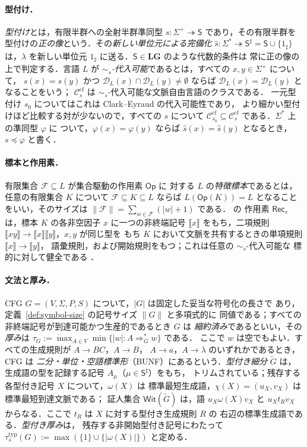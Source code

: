 \documentclass[11pt,a4paper]{ltjsarticle}
\numberwithin{equation}{section}
\theoremstyle{plain}
\theoremstyle{definition}
\theoremstyle{remark}
\theoremstyle{plain}
\newcommand{\cf}{\mathrm{cf}}
\newcommand{\Ccf}[1]{\mathcal C_{#1}^{\cf}}
\newcommand{\Rec}{\mathsf{Rec}}
\newcommand{\WitnessSet}{\mathsf{Wit}}
\newcommand{\NT}[1]{\llbracket #1\rrbracket}
\newcommand{\D}{\mathcal{D}}
\newcommand{\LG}{\mathbf{LG}}
\begin{document}
\paragraph{型付け．}
\emph{型付け}とは，有限半群への全射半群準同型
$s:\Sigma^+\twoheadrightarrow\mathsf S$ であり，その有限半群を
型付けの\emph{正の像}という．その\emph{新しい単位元による完備化}
$\widehat s:\Sigma^*\twoheadrightarrow\mathsf S^\sharp=\mathsf S\cup\{1_\sharp\}$
は，$\lambda$ を新しい単位元 $1_\sharp$ に送る．$\mathsf S\in\LG$ のような代数的条件は
常に正の像の上で判定する．言語 $L$ が
\emph{$\sim_s$-代入可能}であるとは，すべての $x,y\in\Sigma^+$ について，
$s(x)=s(y)$ かつ $\D_L(x)\cap\D_L(y)\ne\emptyset$ ならば
$\D_L(x)=\D_L(y)$ となることをいう；
$\Ccf{s}$ は $\sim_s$-代入可能な文脈自由言語のクラスである．
一元型付け $s_0$ についてはこれは Clark--Eyraud の代入可能性であり，
より細かい型付けほど比較する対が少ないので，すべての $s$ について
$\Ccf{s_0}\subseteq\Ccf{s}$ である．$\Sigma^*$ 上の準同型 $\varphi$ に
ついて，$\varphi(x)=\varphi(y)$ ならば $\widehat s(x)=\widehat s(y)$
となるとき，$s\preceq\varphi$ と書く．

\paragraph{標本と作用素．}
有限集合 $\mathcal F\subseteq L$ が集合駆動の作用素 $\mathsf{Op}$ に
対する $L$ の\emph{特徴標本}であるとは，任意の有限集合 $K$ について
$\mathcal F\subseteq K\subseteq L$ ならば $L(\mathsf{Op}(K))=L$
となることをいい，そのサイズは
$\|\mathcal F\|=\sum_{w\in\mathcal F}(|w|+1)$ である．
\cite[第~4.1~節]{kuriyamaCFG} の
作用素 $\Rec_s$ は，標本 $K$ の各非空因子 $x$ に一つの非終端記号
$\NT{x}$ をもち，二項規則 $\NT{xy}\to\NT{x}\NT{y}$，$x,y$ が同じ型を
もち $K$ において文脈を共有するときの単項規則 $\NT{x}\to\NT{y}$，
語彙規則，および開始規則をもつ；これは任意の $\sim_s$-代入可能な
標的に対して健全である \cite[定理~4.2]{kuriyamaCFG}．

\paragraph{文法と厚み．}
CFG $G=(V,\Sigma,P,S)$ について，$|G|$ は固定した妥当な符号化の長さで
あり，定義~\ref{def:symbol-size} の記号サイズ $\|G\|$ と多項式的に
同値である；すべての非終端記号が到達可能かつ生産的であるとき $G$ は
\emph{縮約済み}であるといい，その\emph{厚み}は
$\tau_G:=\max_{A\in V}\min\{|w|:A\Rightarrow_G^*w\}$ である．
ここで $w$ は空でもよい．すべての生成規則が $A\to BC$，$A\to B$，
$A\to a$，$A\to\lambda$ のいずれかであるとき，CFG は
\emph{二分・単位・空語標準形}（BUNF）にあるという．\emph{型付き細分} $\widetilde G$ は，
生成語の型を記録する記号 $A_\mu$（$\mu\in\mathsf S^\sharp$）をもち，
トリムされている；残存する各型付き記号 $X$ について，$\omega(X)$ は
標準最短生成語，$\chi(X)=(u_X,v_X)$ は標準最短到達文脈である；
証人集合 $\WitnessSet(\widetilde G)$ は，語 $u_X\omega(X)v_X$ と
$u_Xt_Rv_X$ からなる．ここで $t_R$ は $X$ に対する型付き生成規則 $R$ の
右辺の標準生成語である．\emph{型付き厚み}は，
残存する非開始型付き記号にわたって
$\tau^{\mathrm{typ}}_s(G):=\max(\{1\}\cup\{|\omega(X)|\})$ と定める．
\end{document}
